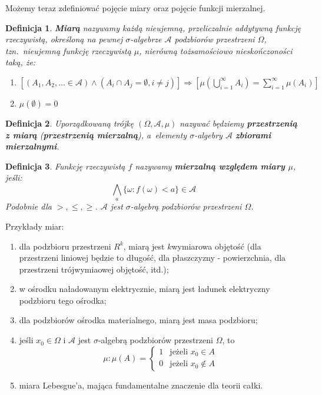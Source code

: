 \documentclass[10pt,a4paper]{article}
\newtheorem{definition}{Definicja}[section]
\numberwithin{equation}{subsection}
\begin{document}
Możemy teraz zdefiniować pojęcie miary oraz pojęcie funkcji mierzalnej.
\begin{definition}
  \textbf{Miarą} nazywamy każdą nieujemną, przeliczalnie addytywną funkcję
  rzeczywistą, określoną na pewnej $\sigma$-algebrze $\mathscr{A}$ podzbiorów
  przestrzeni $\Omega$, tzn.~nieujemną funkcję rzeczywistą $\mu$, nierówną
  tożsamościowo nieskończoności taką, że:
  \begin{enumerate}
    \item $[(A_1,A_2,\dotsc\in\mathscr{A})\land(A_i\cap A_j=\emptyset,i\neq j)]
      \Longrightarrow \left[\mu(\bigcup_{i=1}^{\infty}A_i)=\sum_{i=1}^{\infty}\mu(A_i)\right]$
    \item $\mu(\emptyset)=0$
  \end{enumerate}
\end{definition}

\begin{definition}
  Uporządkowaną trójkę $(\Omega, \mathscr{A}, \mu)$ nazywać będziemy
  \textbf{przestrzenią z miarą} (\textbf{przestrzenią mierzalną}), a~elementy
  $\sigma$-algebry $\mathscr{A}$ \textbf{zbiorami mierzalnymi}.
\end{definition}

\begin{definition}
  Funkcję rzeczywistą $f$ nazywamy \textbf{mierzalną względem miary $\mu$}, jeśli:
  \begin{equation}
    \bigwedge_a\{\omega: f(\omega)<a\}\in \mathscr{A}
  \end{equation}
  Podobnie dla $>,\leq,\geq$. $\mathscr{A}$ jest $\sigma$-algebrą podzbiorów przestrzeni $\Omega$.
\end{definition}

Przykłady miar:
\begin{enumerate}
  \item dla podzbioru przestrzeni $R^k$, miarą jest $k$\dywiz wymiarowa objętość
    (dla przestrzeni liniowej będzie to długość, dla płaszczyzny - powierzchnia,
    dla przestrzeni trójwymiaowej objętość, itd.);
  \item w ośrodku naładowanym elektrycznie, miarą jest ładunek elektryczny
    podzbioru tego ośrodka;
  \item dla podzbiorów ośrodka materialnego, miarą jest masa podzbioru;
  \item jeśli $x_0\in\Omega$ i $\mathscr{A}$ jest $\sigma$-algebrą podzbiorów
    przestrzeni $\Omega$, to
    \[
      \mu: \mu(A) = \left\{ \begin{array}{ll}
      1 & \textrm{jeżeli $x_0\in A$}\\
      0 & \textrm{jeżeli $x_0\notin A$}
      \end{array} \right.
    \]
  \item miara Lebesgue'a, mająca fundamentalne znaczenie dla teorii całki.
\end{enumerate}
\end{document}
